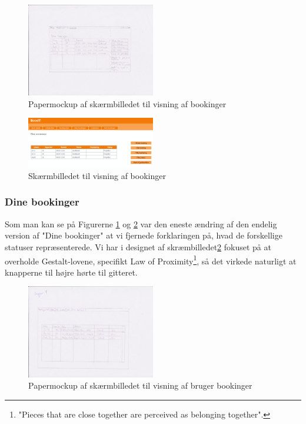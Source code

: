 \begin{figure}[h!]
  \centering
    \includegraphics[width=0.5\textwidth]{Appendix/GUI-Prototype/PaperMockup/DineBookinger_001}
  \caption{Papermockup af skærmbilledet til visning af bookinger}
\label{Design_G_Development_YourBookings}
\end{figure} 

\begin{figure}[h!]
  \centering
    \includegraphics[width=0.5\textwidth]{Appendix/GUI-Prototype/DigitalMockup/DineBookinger}
  \caption{Skærmbilledet til visning af bookinger}
\label{Design_G_Development_YourBookings_Final}
\end{figure} 

\subsubsection{Dine bookinger}
Som man kan se på Figurerne \ref{Design_G_Development_YourBookings} og \ref{Design_G_Development_YourBookings_Final} var den eneste ændring af den endelig version af "Dine bookinger" at vi fjernede forklaringen på, hvad de forskellige statuser repræsenterede. Vi har i designet af skræmbilledet\ref{Design_G_Development_YourBookings_Final} fokuset på at overholde Gestalt-lovene\cite[s. 68]{SL_UID}, specifikt Law of Proximity\footnote{"Pieces that are close together are perceived as belonging together".}, så det virkede naturligt at knapperne til højre hørte til gitteret. 

\begin{figure}[h!]
  \centering
    \includegraphics[width=0.5\textwidth]{Appendix/GUI-Prototype/PaperMockup/GodkendBookinger_001}
  \caption{Papermockup af skærmbilledet til visning af bruger bookinger}
\label{Design_G_Development_ApproveBookings}
\end{figure} 

